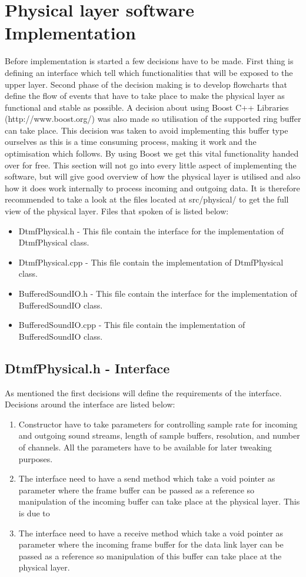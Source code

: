 \section{Physical layer software Implementation}
Before implementation is started a few decisions have to be made. First thing is defining an interface which tell which functionalities
that will be exposed to the upper layer. Second phase of the decision making is to develop flowcharts that define the flow of events 
that have to take place to make the physical layer as functional and stable as possible. A decision about using Boost C++ Libraries
(http://www.boost.org/) was also made so utilisation of the supported ring buffer can take place. This decision was taken to avoid
implementing this buffer type ourselves as this is a time consuming process, making it work and the optimisation which follows.
By using Boost we get this vital functionality handed over for free. This section will not go into every little aspect of implementing
the software, but will give good overview of how the physical layer is utilised and also how it does work internally to process incoming 
and outgoing data. It is therefore recommended to take a look at the files located at src/physical/ to get the full view of the physical layer.
Files that spoken of is listed below:

\begin {itemize}
\item DtmfPhysical.h - This file contain the interface for the implementation of DtmfPhysical class.
\item DtmfPhysical.cpp - This file contain the implementation of DtmfPhysical class.
\item BufferedSoundIO.h - This file contain the interface for the implementation of BufferedSoundIO class.
\item BufferedSoundIO.cpp - This file contain the implementation of BufferedSoundIO class.
\end{itemize}

	\subsection{DtmfPhysical.h - Interface}
	As mentioned the first decisions will define the requirements of the interface. Decisions around the interface are listed below:
	\begin {enumerate}
	\item Constructor have to take parameters for controlling sample rate for incoming and outgoing sound streams, length of sample buffers,
	resolution, and number of channels. All the parameters have to be available for later tweaking purposes.
	\item The interface need to have a send method which take a void pointer as parameter where the frame buffer can be passed as a reference
	so manipulation of the incoming buffer can take place at the physical layer. This is due to 
	\item The interface need to have a receive method which take a void pointer as parameter where the incoming frame buffer for the data link
	layer can be passed as a reference so manipulation of this buffer can take place at the physical layer.
	\end{enumerate}
	
